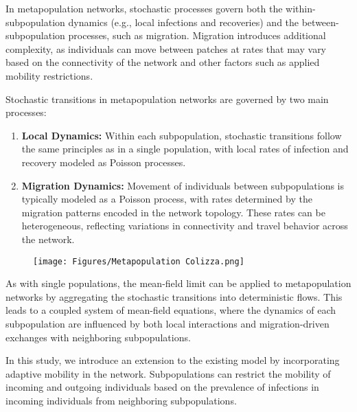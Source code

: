 In metapopulation networks, stochastic processes govern both the within-subpopulation dynamics (e.g., local infections and recoveries) and the between-subpopulation processes, such as migration. Migration introduces additional complexity, as individuals can move between patches at rates that may vary based on the connectivity of the network and other factors such as applied mobility restrictions.

Stochastic transitions in metapopulation networks are governed by two main processes:

\begin{enumerate}
    \item \textbf{Local Dynamics:} Within each subpopulation, stochastic transitions follow the same principles as in a single population, with local rates of infection and recovery modeled as Poisson processes.
    \item \textbf{Migration Dynamics:} Movement of individuals between subpopulations is typically modeled as a Poisson process, with rates determined by the migration patterns encoded in the network topology. These rates can be heterogeneous, reflecting variations in connectivity and travel behavior across the network.
\end{enumerate}

\begin{figure}
    \centering
    \texttt{[image: Figures/Metapopulation Colizza.png]}
\end{figure}
As with single populations, the mean-field limit can be applied to metapopulation networks by aggregating the stochastic transitions into deterministic flows. This leads to a coupled system of mean-field equations, where the dynamics of each subpopulation are influenced by both local interactions and migration-driven exchanges with neighboring subpopulations.

In this study, we introduce an extension to the existing model by incorporating adaptive mobility in the network. Subpopulations can restrict the mobility of incoming and outgoing individuals based on the prevalence of infections in incoming individuals from neighboring subpopulations.

% 